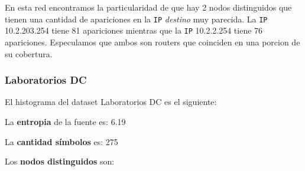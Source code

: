 En esta red encontramos la particularidad de que hay 2 nodos distinguidos que tienen
una cantidad de apariciones en la \texttt{IP} \textit{destino} muy parecida.
La \texttt{IP} 10.2.203.254 tiene 81 apariciones mientras que la \texttt{IP} 10.2.2.254 tiene 76 apariciones. Especulamos que ambos son routers que coinciden en una porcion de su cobertura.

\subsubsection{Laboratorios DC}

El histograma del dataset Laboratorios DC es el siguiente:

\begin{center}
\end{center}

La \textbf{entropia} de la fuente es: 6.19

La \textbf{cantidad símbolos} es: 275

Los \textbf{nodos distinguidos} son:

